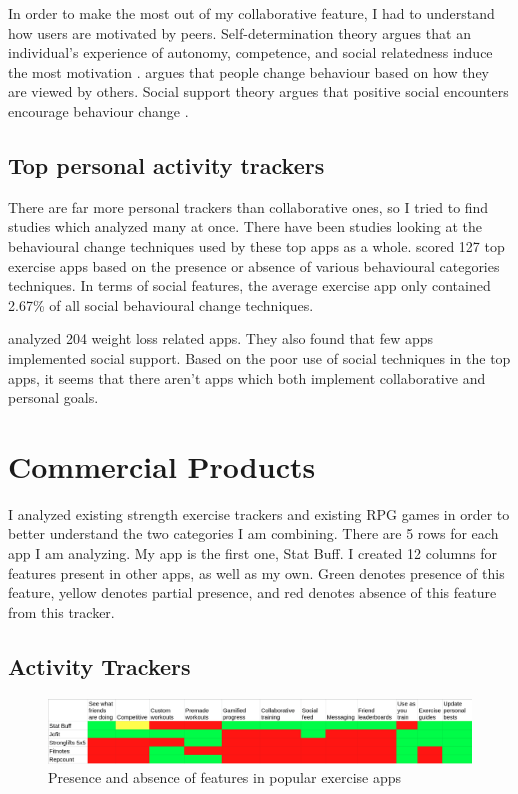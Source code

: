 \documentclass{l4proj}
\begin{document}
In order to make the most out of my collaborative feature, I had to understand how users are motivated by peers. Self-determination theory argues that an individual's experience of autonomy, competence, and social relatedness induce the most motivation \citep{self_determination_theory}. \citet{social_comparison_theory} argues that people change behaviour based on how they are viewed by others. Social support theory argues that positive social encounters encourage behaviour change \citep{social_support_theory}. 

\subsection{Top personal activity trackers}
 There are far more personal trackers than collaborative ones, so I tried to find studies which analyzed many at once. There have been studies looking at the behavioural change techniques used by these top apps as a whole. \citet{AppsOfSteel} scored 127 top exercise apps based on the presence or absence of various behavioural categories techniques. In terms of social features, the average exercise app only contained 2.67\% of all social behavioural change techniques.  

 \citet{weight_loss} analyzed 204 weight loss related apps. They also found that few apps implemented social support. Based on the poor use of social techniques in the top apps, it seems that there aren't apps which both implement collaborative and personal goals. 


\section{Commercial Products}
I analyzed existing strength exercise trackers and existing RPG games in order to better understand the two categories I am combining. There are 5 rows for each app I am analyzing. My app is the first one, Stat Buff. I created 12 columns for features present in other apps, as well as my own. Green denotes presence of this feature, yellow denotes partial presence, and red denotes absence of this feature from this tracker.

\subsection{Activity Trackers}
\begin{figure}[H]
    \centering
    \includegraphics[width=1.0\linewidth]{exercise_comparisons.png}    
    \caption{Presence and absence of features in popular exercise apps}
    \label{fig:exercises} 
\end{figure}
\end{document}
